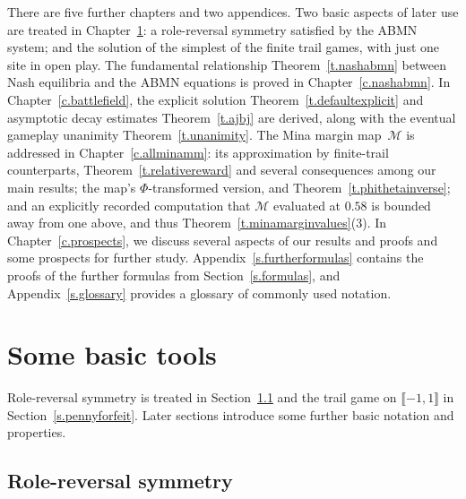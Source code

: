 \documentclass[letterpaper,11pt,oneside,reqno]{amsbook}
\numberwithin{figure}{chapter}
\theoremstyle{definition}
\theoremstyle{definition}
\theoremstyle{definition}
\theoremstyle{definition}
\theoremstyle{definition}
\newcommand{\minamm}{\mathcal{M}}
\newcommand{\PhiMac}{\Phi}
\newcommand{\abmnmacspace}{\textrm{ABMN} }
\begin{document}
There are five further chapters and two appendices. Two basic aspects of later use are treated in Chapter~\ref{c.tools}: a role-reversal symmetry satisfied by the \abmnmacspace system; and the solution of the simplest of the finite trail games, with just one site in open play. The fundamental relationship Theorem~\ref{t.nashabmn} between Nash equilibria and the \abmnmacspace equations is proved in Chapter~\ref{c.nashabmn}.
In Chapter~\ref{c.battlefield}, the explicit solution Theorem~\ref{t.defaultexplicit} 
and asymptotic decay estimates  Theorem~\ref{t.ajbj} are derived, along with the eventual gameplay unanimity  Theorem~\ref{t.unanimity}.
The Mina margin map~$\minamm$ is addressed in Chapter~\ref{c.allminamm}: its approximation by finite-trail counterparts, Theorem~\ref{t.relativereward} and several consequences among our main results; the map's $\PhiMac$-transformed version, and Theorem~\ref{t.phithetainverse}; and an explicitly recorded computation that $\minamm$ evaluated at $0.58$ is bounded away from one above, and thus Theorem~\ref{t.minamarginvalues}(3).
In Chapter~\ref{c.prospects}, we discuss several aspects of our results and proofs and some prospects for further study. 
Appendix~\ref{s.furtherformulas} contains the proofs of the further formulas from Section~\ref{s.formulas}, and Appendix~\ref{s.glossary} provides a glossary of commonly used notation.



  


\chapter{Some basic tools}\label{c.tools}

Role-reversal symmetry is treated in Section~\ref{s.rolereversal} and the trail game on $\llbracket -1,1 \rrbracket$ in Section~\ref{s.pennyforfeit}.
Later sections introduce some further  basic notation and properties.
\section{Role-reversal symmetry}\label{s.rolereversal}
\end{document}
